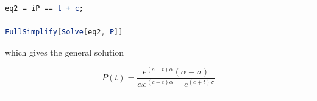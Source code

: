 \begin{lstlisting}[language=Mathematica]
eq2 = iP == t + c;

FullSimplify[Solve[eq2, P]]

\end{lstlisting}

which gives the general solution

\begin{equation} P(t) = \frac{e^{(c+t)\alpha} (\alpha - \sigma)}{\alpha e^{(c+t) \alpha} - e^{(c+t) \sigma}} \end{equation}

\begin{center}\rule{0.5\linewidth}{\linethickness}\end{center}
